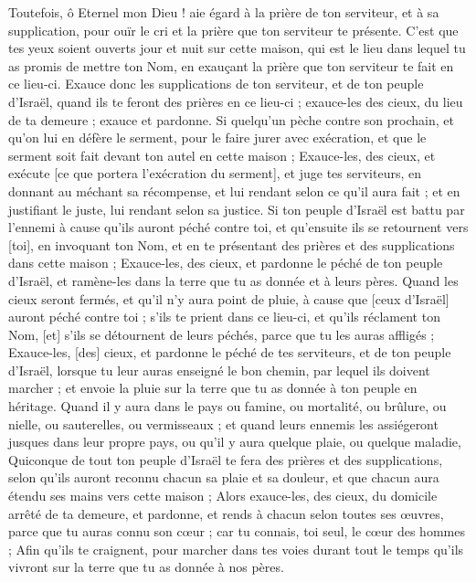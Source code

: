 \begin{multicols}{2}
Toutefois, ô Eternel mon Dieu ! aie égard à la prière de ton serviteur, et à sa supplication, pour ouïr le cri et la prière que ton serviteur te présente.
C'est que tes yeux soient ouverts jour et nuit sur cette maison, qui est le lieu dans lequel tu as promis de mettre ton Nom, en exauçant la prière que ton serviteur te fait en ce lieu-ci.
Exauce donc les supplications de ton serviteur, et de ton peuple d'Israël, quand ils te feront des prières en ce lieu-ci ; exauce-les des cieux, du lieu de ta demeure ; exauce et pardonne.
Si quelqu'un pèche contre son prochain, et qu'on lui en défère le serment, pour le faire jurer avec exécration, et que le serment soit fait devant ton autel en cette maison ;
Exauce-les, des cieux, et exécute [ce que portera l'exécration du serment], et juge tes serviteurs, en donnant au méchant sa récompense, et lui rendant selon ce qu'il aura fait ; et en justifiant le juste, lui rendant selon sa justice.
Si ton peuple d'Israël est battu par l'ennemi à cause qu'ils auront péché contre toi, et qu'ensuite ils se retournent vers [toi], en invoquant ton Nom, et en te présentant des prières et des supplications dans cette maison ;
Exauce-les, des cieux, et pardonne le péché de ton peuple d'Israël, et ramène-les dans la terre que tu as donnée et à leurs pères.
Quand les cieux seront fermés, et qu'il n'y aura point de pluie, à cause que [ceux d'Israël] auront péché contre toi ; s'ils te prient dans ce lieu-ci, et qu'ils réclament ton Nom, [et] s'ils se détournent de leurs péchés, parce que tu les auras affligés ;
Exauce-les, [des] cieux, et pardonne le péché de tes serviteurs, et de ton peuple d'Israël, lorsque tu leur auras enseigné le bon chemin, par lequel ils doivent marcher ; et envoie la pluie sur la terre que tu as donnée à ton peuple en héritage.
Quand il y aura dans le pays ou famine, ou mortalité, ou brûlure, ou nielle, ou sauterelles, ou vermisseaux ; et quand leurs ennemis les assiégeront jusques dans leur propre pays, ou qu'il y aura quelque plaie, ou quelque maladie,
Quiconque de tout ton peuple d'Israël te fera des prières et des supplications, selon qu'ils auront reconnu chacun sa plaie et sa douleur, et que chacun aura étendu ses mains vers cette maison ;
Alors exauce-les, des cieux, du domicile arrêté de ta demeure, et pardonne, et rends à chacun selon toutes ses œuvres, parce que tu auras connu son cœur ; car tu connais, toi seul, le cœur des hommes ;
Afin qu'ils te craignent, pour marcher dans tes voies durant tout le temps qu'ils vivront sur la terre que tu as donnée à nos pères.

\end{multicols}
